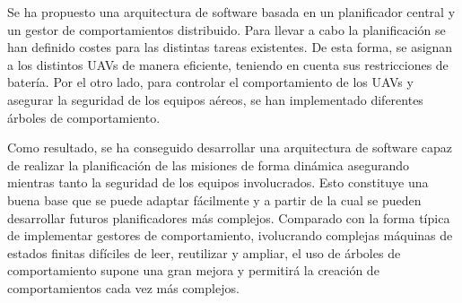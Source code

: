 \documentclass[fontsize=11pt, English=false, Español=true, Myfinal=true, twoside, numbers=noenddot]{scrbook}
\begin{document}
Se ha propuesto una arquitectura de software basada en un planificador central y un gestor de comportamientos distribuido. Para llevar a cabo la planificación se han definido costes para las distintas tareas existentes. De esta forma, se asignan a los distintos UAVs de manera eficiente, teniendo en cuenta sus restricciones de batería. Por el otro lado, para controlar el comportamiento de los UAVs y asegurar la seguridad de los equipos aéreos, se han implementado diferentes árboles de comportamiento.

Como resultado, se ha conseguido desarrollar una arquitectura de software capaz de realizar la planificación de las misiones de forma dinámica asegurando mientras tanto la seguridad de los equipos involucrados. Esto constituye una buena base que se puede adaptar fácilmente y a partir de la cual se pueden desarrollar futuros planificadores más complejos. Comparado con la forma típica de implementar gestores de comportamiento, ivolucrando complejas máquinas de estados finitas difíciles de leer, reutilizar y ampliar, el uso de árboles de comportamiento supone una gran mejora y permitirá la creación de comportamientos cada vez más complejos.



\cleardoublepage
{}
\pagestyle{especial}
\tableofcontents


\mainmatter

\pagestyle{esitscCD}

%
%
\end{document}
